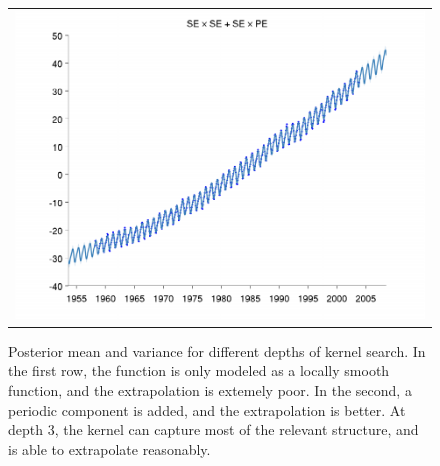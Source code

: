 \documentclass[twoside]{article}
\begin{document}
\begin{figure}[h!]
\begin{tabular}{c}
 \includegraphics[width=\wmg,height=\hmg]{../figures/decomposition/03-mauna2003_max_level_2/03-mauna2003_all}
\end{tabular}
\caption{Posterior mean and variance for different depths of kernel search.  In the first row, the function is only modeled as a locally smooth function, and the extrapolation is extemely poor.  In the second, a periodic component is added, and the extrapolation is better.  At depth 3, the kernel can capture most of the relevant structure, and is able to extrapolate reasonably.}
\label{fig:mauna_grow}
\end{figure}
\end{document}
